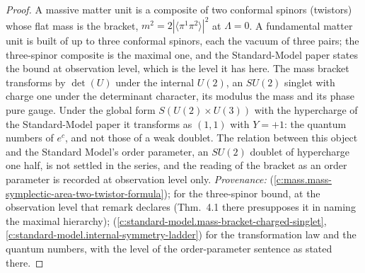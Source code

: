 \documentclass[11pt]{article}
\theoremstyle{definition}
\theoremstyle{plain}
\providecommand{\br}{}\renewcommand{\br}[1]{\langle #1\rangle}
\begin{document}
\begin{proof}
A massive matter unit is a composite of two conformal spinors (twistors) whose flat mass is the bracket, $m^{2} = 2|\br{\pi^{1}\pi^{2}}|^{2}$ at $\Lambda = 0$. A fundamental matter unit is built of up to three conformal spinors, each the vacuum of three pairs; the three-spinor composite is the maximal one, and the Standard-Model paper states the bound at observation level, which is the level it has here. The mass bracket transforms by $\det(U)$ under the internal $U(2)$, an $SU(2)$ singlet with charge one under the determinant character, its modulus the mass and its phase pure gauge. Under the global form $S(U(2) \times U(3))$ with the hypercharge of the Standard-Model paper it transforms as $(1,1)$ with $Y = +1$: the quantum numbers of $e^{c}$, and not those of a weak doublet. The relation between this object and the Standard Model's order parameter, an $SU(2)$ doublet of hypercharge one half, is not settled in the series, and the reading of the bracket as an order parameter is recorded at observation level only. \emph{Provenance:} \cite[Prop.~4.1]{ButlerT11} (\ref{c:mass.mass-symplectic-area-two-twistor-formula}); \cite[Rem.~3.3]{ButlerT12} for the three-spinor bound, at the observation level that remark declares (Thm.~4.1 there presupposes it in naming the maximal hierarchy); \cite[Props.~3.1-3.2]{ButlerT12} (\ref{c:standard-model.mass-bracket-charged-singlet}, \ref{c:standard-model.internal-symmetry-ladder}) for the transformation law and the quantum numbers, with the level of the order-parameter sentence as stated there.

\end{proof}
\end{document}
